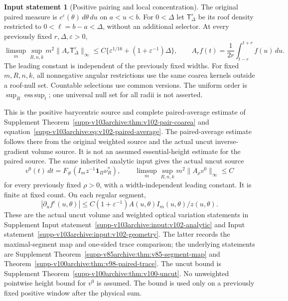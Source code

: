 \documentclass[11pt,reqno]{amsart}
\numberwithin{equation}{section}
\theoremstyle{definition}\newtheorem{definition}[theorem]{Definition}
\newtheorem{inputstatement}[theorem]{Input statement}
\theoremstyle{remark}\newtheorem{remark}[theorem]{Remark}
\newcommand{\one}{\mathbf1}\newcommand{\dd}{\,\mathrm d}
\newcommand{\esssup}{\operatorname*{ess\,sup}}
\begin{document}
\begin{inputstatement}[Positive pairing and local concentration]
\label{input:v104-pair}
The original paired measure is
$c^\varepsilon(\theta)\,d\theta\,du$ on $a<u<b$.
For $0<\Delta$ let $\mathsf T_\Delta^\varepsilon$ be its roof
density restricted to $0<\ell=b-a<\Delta$, without an additional
selector. At every previously fixed $r,\Delta,\varepsilon>0$,
\begin{equation}\label{eq:v104-paired-average}
 \limsup_m\sup_{R,n,k}m^2
       \|A_r\mathsf T_\Delta^\varepsilon\|_\infty
 \le C\{\varepsilon^{1/16}+(1+\varepsilon^{-1})\Delta\},
 \qquad A_rf(t)=\frac1{2r}\int_{t-r}^{t+r}f(u)\,du.
\end{equation}
The leading constant is independent of the previously fixed widths.
For fixed $m,R,n,k$, all nonnegative angular restrictions use the
same coarea kernels outside a roof-null set. Countable selections
use common versions. The uniform order is $\sup_R\esssup_t$;
one universal null set for all radii is not asserted.
\end{inputstatement}
This is the positive barycentric source and complete paired-average
estimate of Supplement Theorem~\ref{supp-v103archive:thm:v102-pair-coarea}
and equation~\eqref{supp-v103archive:eq:v102-paired-average}.
The paired-average estimate follows there from the original weighted
source and the actual uncut inverse-gradient volume source. It is
not an assumed essential-height estimate for the paired source.
The same inherited analytic input gives the actual uncut source
\begin{equation}\label{eq:v104-uncut-input}
 v^0(t)\,dt=F_\#(I_m z^{-1}\one_\Pi\nu_R^*),\qquad
 \limsup_m\sup_{R,n,k}m^2\|A_\rho v^0\|_\infty\le C
\end{equation}
for every previously fixed $\rho>0$, with a width-independent leading
constant. It is finite at fixed count. On each regular segment,
\begin{equation}\label{eq:v104-weighted-variation-input}
 |\partial_u f^\varepsilon(u,\theta)|
 \le C(1+\varepsilon^{-1})A(u,\theta)I_m(u,\theta)/z(u,\theta).
\end{equation}
These are the actual uncut volume and weighted optical variation
statements in Supplement Input statement~\ref{supp-v103archive:input:v102-analytic}
and Input statement~\ref{supp-v103archive:input:v102-geometry}.
The latter records the maximal-segment map and one-sided trace
comparison; the underlying statements are Supplement
Theorem~\ref{supp-v85archive:thm:v85-segment-map} and
Theorem~\ref{supp-v100archive:thm:v98-paired-trace}.
The uncut bound is Supplement
Theorem~\ref{supp-v100archive:thm:v100-uncut}.
No unweighted pointwise height bound for
$v^0$ is assumed. The bound is used only on a previously fixed
positive window after the physical sum.
\end{document}
